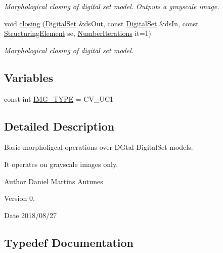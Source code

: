 \begin{DoxyCompactItemize}
\begin{DoxyCompactList}\small\item\em Morphological closing of digital set model. Outputs a grayscale image. \end{DoxyCompactList}\item 
void \hyperlink{namespaceDIPaCUS_1_1Morphology_ade37dc7772e3a0247aba7270b6c34a2f}{closing} (\hyperlink{namespaceDIPaCUS_1_1Morphology_ab69fa725716b0ed4c311c0d00a292be7}{Digital\+Set} \&ds\+Out, const \hyperlink{namespaceDIPaCUS_1_1Morphology_ab69fa725716b0ed4c311c0d00a292be7}{Digital\+Set} \&ds\+In, const \hyperlink{structDIPaCUS_1_1Morphology_1_1StructuringElement}{Structuring\+Element} se, \hyperlink{namespaceDIPaCUS_1_1Morphology_a8ffa7d1c2023be8b21bc87a4b7df7cca}{Number\+Iterations} it=1)
\begin{DoxyCompactList}\small\item\em Morphological closing of digital set model. \end{DoxyCompactList}\end{DoxyCompactItemize}
\subsection*{Variables}
\begin{DoxyCompactItemize}
\item 
const int \hyperlink{namespaceDIPaCUS_1_1Morphology_ae40d30ec8ea7661ab5ab1c36795837d0}{I\+M\+G\+\_\+\+T\+Y\+PE} = C\+V\+\_\+U\+C1
\end{DoxyCompactItemize}


\subsection{Detailed Description}
Basic morpholigcal operations over D\+Gtal Digital\+Set models. 

It operates on grayscale images only. \begin{DoxyAuthor}{Author}
Daniel Martins Antunes 
\end{DoxyAuthor}
\begin{DoxyVersion}{Version}
0. 
\end{DoxyVersion}
\begin{DoxyDate}{Date}
2018/08/27 
\end{DoxyDate}


\subsection{Typedef Documentation}
\mbox{\label{namespaceDIPaCUS_1_1Morphology_ab69fa725716b0ed4c311c0d00a292be7}} 
